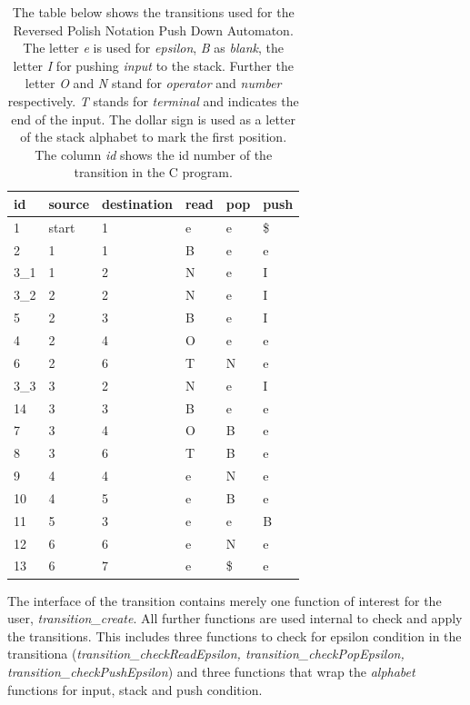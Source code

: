 \documentclass[a4paper,11pt,twoside]{article}
\begin{document}
\begin{table}[]
\centering
\caption{The table below shows the transitions used for the Reversed
  Polish Notation Push Down Automaton. The letter \textit{e} is used
  for \textit{epsilon}, \textit{B} as \textit{blank}, the letter
  \textit{I} for pushing \textit{input} to the stack. Further the
  letter \textit{O} and \textit{N} stand for \textit{operator} and
  \textit{number} respectively. \textit{T} stands for \textit{terminal} 
  and indicates the end of the input. The dollar sign is used as a
  letter of the stack alphabet to mark the first position. The column
  \textit{id} shows the id number of the transition in the C program.}
\label{tab:trans}
\begin{tabular}{llllll}
id  & source & destination & read & pop & push \\ \hline
1   & start  & 1           & e    & e   & \$    \\
2   & 1      & 1           & B    & e   & e    \\
3\_1 & 1      & 2           & N    & e   & I    \\
3\_2 & 2      & 2           & N    & e   & I    \\
5   & 2      & 3           & B    & e   & I    \\
4   & 2      & 4           & O    & e   & e    \\
6   & 2      & 6           & T    & N   & e    \\
3\_3 & 3      & 2           & N    & e   & I    \\
14  & 3      & 3           & B    & e   & e    \\
7   & 3      & 4           & O    & B   & e    \\
8   & 3      & 6           & T    & B   & e    \\
9   & 4      & 4           & e    & N   & e    \\
10  & 4      & 5           & e    & B   & e    \\
11  & 5      & 3           & e    & e   & B    \\
12  & 6      & 6           & e    & N   & e    \\
13  & 6      & 7           & e    & \$   & e   
\end{tabular}
\end{table}

The interface of the transition contains merely one function of
interest for the user, \textit{transition\_create}. All further
functions are used internal to check and apply the transitions. This
includes three functions to check for epsilon condition in the
transitiona (\textit{transition\_checkReadEpsilon,
  transition\_checkPopEpsilon, transition\_checkPushEpsilon}) and three
functions that wrap the \textit{alphabet} functions for input, stack
and push condition. 
\end{document}
